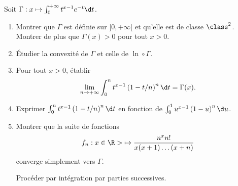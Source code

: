 \begin{enonce}
\begin{exercise}[ID={RMS135 E954},subtitle={Mines-Ponts PSI 2024},tags={oraux},difficulty={}]
  Soit $\Gamma : x\mapsto \int_0^{+\infty} t^{x-1} e^{-t} \d t$.
  \begin{enumerate}
    \item Montrer que $\Gamma$ est définie sur $]0,+\infty[$ et qu'elle est de classe $\class^2$.
      Montrer de plus que $\Gamma(x)>0$ pour tout $x>0$.

    \item Étudier la convexité de $\Gamma$ et celle de $\ln\circ \Gamma$.


    \item Pour tout $x>0$, établir
      \begin{equation*}
        \lim_{n\to+\infty} \int_0^n t^{x-1} \left( 1 - t/n \right)^n \d t = \Gamma(x).
      \end{equation*}

    \item Exprimer $\int_0^n t^{x-1} \left( 1-t/n \right)^n \d t$ en fonction de $\int_0^1 u^{x-1} \left( 1-u \right)^n \d u$.

    \item Montrer que la suite de fonctions
      \begin{equation*}
        f_n : x\in{\R>}\mapsto \frac{n^x n!}{x(x+1)\dots(x+n)}
      \end{equation*}
      converge simplement vers $\Gamma$.
      \begin{hint}
      Procéder par intégration par parties successives.
      \end{hint}
  \end{enumerate}
\end{exercise}
\begin{solution}
\end{solution}
\end{enonce}
